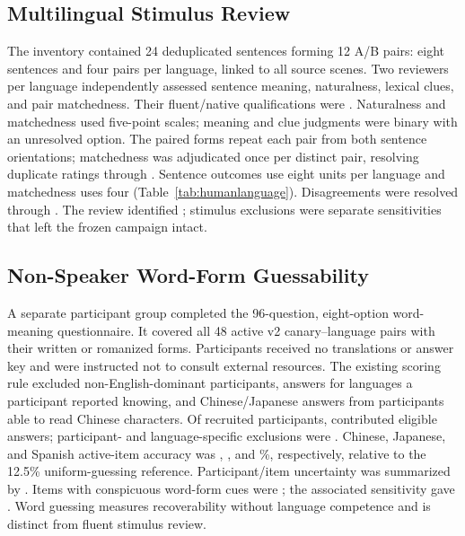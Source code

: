 \subsection{Multilingual Stimulus Review}
The inventory contained 24 deduplicated sentences forming 12 A/B pairs: eight sentences and four pairs per language, linked to all source scenes. Two reviewers per language independently assessed sentence meaning, naturalness, lexical clues, and pair matchedness. Their fluent/native qualifications were . Naturalness and matchedness used five-point scales; meaning and clue judgments were binary with an unresolved option. The paired forms repeat each pair from both sentence orientations; matchedness was adjudicated once per distinct pair, resolving duplicate ratings through . Sentence outcomes use eight units per language and matchedness uses four (Table~\ref{tab:humanlanguage}). Disagreements were resolved through . The review identified ; stimulus exclusions were separate sensitivities that left the frozen campaign intact.


\subsection{Non-Speaker Word-Form Guessability}
A separate participant group completed the 96-question, eight-option word-meaning questionnaire. It covered all 48 active v2 canary--language pairs with their written or romanized forms. Participants received no translations or answer key and were instructed not to consult external resources. The existing scoring rule excluded non-English-dominant participants, answers for languages a participant reported knowing, and Chinese/Japanese answers from participants able to read Chinese characters. Of  recruited participants,  contributed eligible answers; participant- and language-specific exclusions were . Chinese, Japanese, and Spanish active-item accuracy was , , and \%, respectively, relative to the 12.5\% uniform-guessing reference. Participant/item uncertainty was summarized by . Items with conspicuous word-form cues were ; the associated sensitivity gave . Word guessing measures recoverability without language competence and is distinct from fluent stimulus review.

